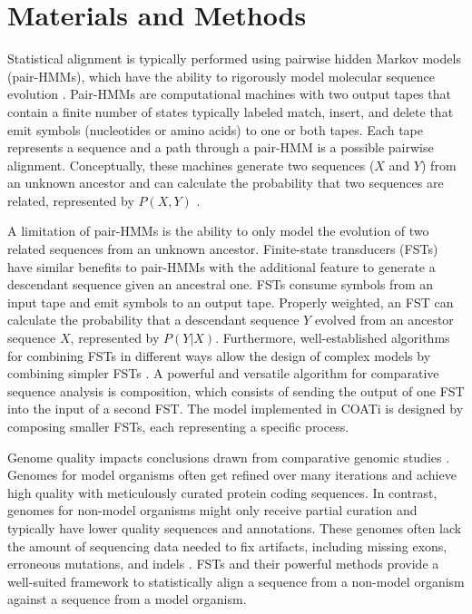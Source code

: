 \section*{Materials and Methods}  %

Statistical alignment is typically performed using pairwise hidden Markov models (pair-HMMs), which have the ability to rigorously model molecular sequence evolution .
Pair-HMMs are computational machines with two output tapes that contain a finite number of states typically labeled match, insert, and delete that emit symbols (nucleotides or amino acids) to one or both tapes.
Each tape represents a sequence and a path through a pair-HMM is a possible pairwise alignment.
Conceptually, these machines generate two sequences ($X$ and $Y$) from an unknown ancestor and can calculate the probability that two sequences are related, represented by $P(X, Y)$ .

A limitation of pair-HMMs is the ability to only model the evolution of two related sequences from an unknown ancestor.
Finite-state transducers (FSTs) have similar benefits to pair-HMMs with the additional feature to generate a descendant sequence given an ancestral one.
FSTs consume symbols from an input tape and emit symbols to an output tape.
Properly weighted, an FST can calculate the probability that a descendant sequence $Y$ evolved from an ancestor sequence $X$, represented by $P(Y | X)$.
Furthermore, well-established algorithms for combining FSTs in different ways allow the design of complex models by combining simpler FSTs .
A powerful and versatile algorithm for comparative sequence analysis is composition, which consists of sending the output of one FST into the input of a second FST.
The model implemented in COATi is designed by composing smaller FSTs, each representing a specific process.

Genome quality impacts conclusions drawn from comparative genomic studies .
Genomes for model organisms often get refined over many iterations and achieve high quality with meticulously curated protein coding sequences.
In contrast, genomes for non-model organisms might only receive partial curation and typically have lower quality sequences and annotations.
These genomes often lack the amount of sequencing data needed to fix artifacts, including missing exons, erroneous mutations, and indels .
FSTs and their powerful methods provide a well-suited framework to statistically align a sequence from a non-model organism against a sequence from a model organism.

